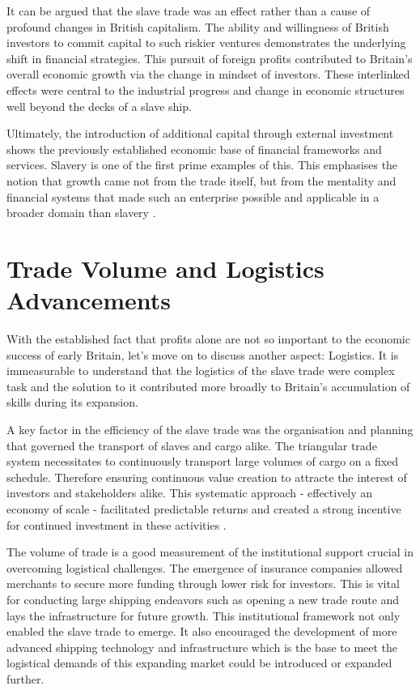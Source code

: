 \documentclass[a4paper,11pt]{article}
\begin{document}
It can be argued that the slave trade was an effect rather than a cause of profound changes in British capitalism. The ability and willingness of British investors to commit capital to such riskier ventures demonstrates the underlying shift in financial strategies. This pursuit of foreign profits contributed to Britain's overall economic growth via the change in mindset of investors. These interlinked effects were central to the industrial progress and change in economic structures well beyond the decks of a slave ship.

Ultimately, the introduction of additional capital through external investment shows the previously established economic base of financial frameworks and services. Slavery is one of the first prime examples of this. This emphasises the notion that growth came not from the trade itself, but from the mentality and financial systems that made such an enterprise possible and applicable in a broader domain than slavery \citep{harley2015}.

\section{Trade Volume and Logistics Advancements}

With the established fact that profits alone are not so important to the economic success of early Britain, let's move on to discuss another aspect: Logistics. It is immeasurable to understand that the logistics of the slave trade were complex task and the solution to it contributed more broadly to Britain's accumulation of skills during its expansion.

A key factor in the efficiency of the slave trade was the organisation and planning that governed the transport of slaves and cargo alike. The triangular trade system necessitates to continuously transport large volumes of cargo on a fixed schedule. Therefore ensuring continuous value creation to attracte the interest of investors and stakeholders alike. This systematic approach - effectively an economy of scale - facilitated predictable returns and created a strong incentive for continued investment in these activities \citep{harley2015}.

The volume of trade is a good measurement of the institutional support crucial in overcoming logistical challenges. The emergence of insurance companies allowed merchants to secure more funding through lower risk for investors. This is vital for conducting large shipping endeavors such as opening a new trade route and lays the infrastructure for future growth. This institutional framework not only enabled the slave trade to emerge. It also encouraged the development of more advanced shipping technology and infrastructure which is the base to meet the logistical demands of this expanding market could be introduced or expanded further.
\end{document}

